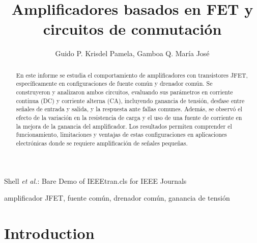 \documentclass[journal]{IEEEtran}
\begin{document}
\title{Amplificadores basados en FET y circuitos de conmutación}
\author{Guido P. Krisdel Pamela, Gamboa Q. María José} 

{Shell \MakeLowercase{\textit{et al.}}: Bare Demo of IEEEtran.cls for IEEE Journals}

\maketitle
\renewcommand{\abstractname}{Resumen}
\begin{abstract}
En este informe se estudia el comportamiento de amplificadores con transistores JFET, específicamente en configuraciones de fuente común y drenador común. Se construyeron y analizaron ambos circuitos, evaluando sus parámetros en corriente continua (DC) y corriente alterna (CA), incluyendo ganancia de tensión, desfase entre señales de entrada y salida, y la respuesta ante fallas comunes. Además, se observó el efecto de la variación en la resistencia de carga y el uso de una fuente de corriente en la mejora de la ganancia del amplificador. Los resultados permiten comprender el funcionamiento, limitaciones y ventajas de estas configuraciones en aplicaciones electrónicas donde se requiere amplificación de señales pequeñas.
\end{abstract}

\renewcommand{\IEEEkeywordsname}{Palabras clave}
\begin{IEEEkeywords}
amplificador JFET, fuente común, drenador común, ganancia de tensión
\end{IEEEkeywords}

\IEEEpeerreviewmaketitle

\section{Introduction}
\end{document}
